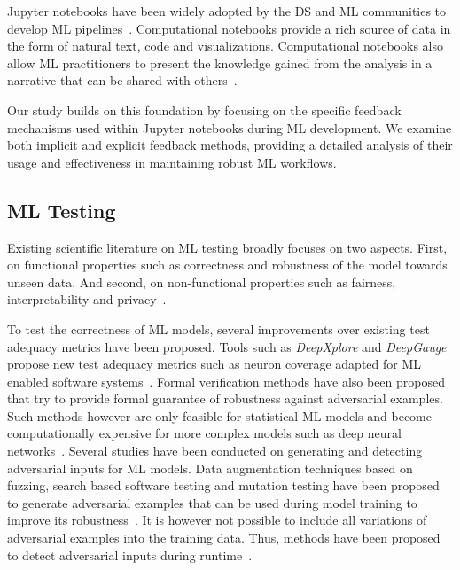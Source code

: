 \documentclass[smallextended]{svjour3}       %
\begin{document}
Jupyter notebooks have been widely adopted by the DS and ML communities to develop ML pipelines~\citep{wang2020assessing,pimentel2019large-scale,quaranta2021kgtorrent}. Computational notebooks provide a rich source of data in the form of natural text, code and visualizations. Computational notebooks also allow ML practitioners to present the knowledge gained from the analysis in a narrative that can be shared with others~\citep{rule2018exploration}.

Our study builds on this foundation by focusing on the specific feedback mechanisms used within Jupyter notebooks during ML development. We examine both implicit and explicit feedback methods, providing a detailed analysis of their usage and effectiveness in maintaining robust ML workflows.

\subsection{ML Testing}\label{sec:ml-testing}

Existing scientific literature on ML testing broadly focuses on two aspects. First, on functional properties such as correctness and robustness of the model towards unseen data. And second, on non-functional properties such as fairness, interpretability and privacy~\citep{zhang2022machine,mehrabi2021survey,chen2022fairness}.

To test the correctness of ML models, several improvements over existing test adequacy metrics have been proposed. Tools such as \textit{DeepXplore} and \textit{DeepGauge} propose new test adequacy metrics such as neuron coverage adapted for ML enabled software systems~\citep{pei2017deepxplore,ma2018deepgauge,gerasimou2020importance-driven}. Formal verification methods have also been proposed that try to provide formal guarantee of robustness against adversarial examples. Such methods however are only feasible for statistical ML models and become computationally expensive for more complex models such as deep neural networks~\citep{zhu2021deepmemory,baluta2021scalable}. Several studies have been conducted on generating and detecting adversarial inputs for ML models. Data augmentation techniques based on fuzzing, search based software testing and mutation testing have been proposed to generate adversarial examples that can be used during model training to improve its robustness~\citep{braiek2019deepevolution,gao2020fuzz,wang2021robot,zhang2020white-box}. It is however not possible to include all variations of adversarial examples into the training data. Thus, methods have been proposed to detect adversarial inputs during runtime~\citep{xiao2021self-checking,wang2020dissector,wang2019adversarial,berend2020cats}.
\end{document}
